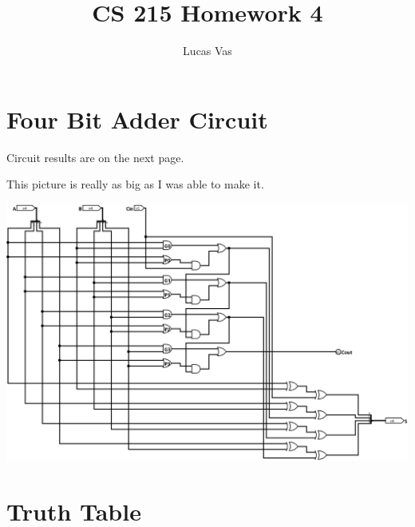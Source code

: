 \documentclass[12pt]{article}
\begin{document}
\title{CS 215 Homework 4}
\author{Lucas Vas}
\maketitle

\section*{Four Bit Adder Circuit}

Circuit results are on the next page.

\clearpage

This picture is really as big as I was able to make it.

\begin{center}
\includegraphics[width=7in]{4xAdderLookAhead}
\end{center}

\clearpage

\section*{Truth Table}
\end{document}
